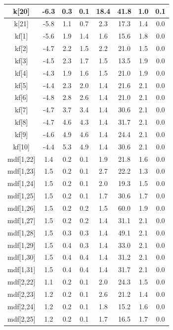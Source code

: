 \begin{longtable}{|c|c|c|c|c|c|c|c|}
\hline
k[20] & -6.3 & 0.3 & 0.1 & 18.4 & 41.8 & 1.0 & 0.1 \\
\hline
k[21] & -5.8 & 1.1 & 0.7 & 2.3 & 17.3 & 1.4 & 0.0 \\
\hline
kf[1] & -5.6 & 1.9 & 1.4 & 1.6 & 15.6 & 1.8 & 0.0 \\
\hline
kf[2] & -4.7 & 2.2 & 1.5 & 2.2 & 21.0 & 1.5 & 0.0 \\
\hline
kf[3] & -4.5 & 2.3 & 1.7 & 1.5 & 13.5 & 1.9 & 0.0 \\
\hline
kf[4] & -4.3 & 1.9 & 1.6 & 1.5 & 21.0 & 1.9 & 0.0 \\
\hline
kf[5] & -4.4 & 2.3 & 2.0 & 1.4 & 21.6 & 2.1 & 0.0 \\
\hline
kf[6] & -4.8 & 2.8 & 2.6 & 1.4 & 21.0 & 2.1 & 0.0 \\
\hline
kf[7] & -4.7 & 3.7 & 3.4 & 1.4 & 30.6 & 2.1 & 0.0 \\
\hline
kf[8] & -4.7 & 4.6 & 4.3 & 1.4 & 31.7 & 2.1 & 0.0 \\
\hline
kf[9] & -4.6 & 4.9 & 4.6 & 1.4 & 24.4 & 2.1 & 0.0 \\
\hline
kf[10] & -4.4 & 5.3 & 4.9 & 1.4 & 30.6 & 2.1 & 0.0 \\
\hline
mdf[1,22] & 1.4 & 0.2 & 0.1 & 1.9 & 21.8 & 1.6 & 0.0 \\
\hline
mdf[1,23] & 1.5 & 0.2 & 0.1 & 2.7 & 22.2 & 1.3 & 0.0 \\
\hline
mdf[1,24] & 1.5 & 0.2 & 0.1 & 2.0 & 19.3 & 1.5 & 0.0 \\
\hline
mdf[1,25] & 1.5 & 0.2 & 0.1 & 1.7 & 30.6 & 1.7 & 0.0 \\
\hline
mdf[1,26] & 1.5 & 0.2 & 0.2 & 1.5 & 60.0 & 1.9 & 0.0 \\
\hline
mdf[1,27] & 1.5 & 0.2 & 0.2 & 1.4 & 31.1 & 2.1 & 0.0 \\
\hline
mdf[1,28] & 1.5 & 0.3 & 0.3 & 1.4 & 49.1 & 2.1 & 0.0 \\
\hline
mdf[1,29] & 1.5 & 0.4 & 0.3 & 1.4 & 33.0 & 2.1 & 0.0 \\
\hline
mdf[1,30] & 1.5 & 0.4 & 0.4 & 1.4 & 31.2 & 2.1 & 0.0 \\
\hline
mdf[1,31] & 1.5 & 0.4 & 0.4 & 1.4 & 31.7 & 2.1 & 0.0 \\
\hline
mdf[2,22] & 1.1 & 0.2 & 0.1 & 2.0 & 24.3 & 1.5 & 0.0 \\
\hline
mdf[2,23] & 1.2 & 0.2 & 0.1 & 2.6 & 21.2 & 1.4 & 0.0 \\
\hline
mdf[2,24] & 1.2 & 0.2 & 0.1 & 1.8 & 15.2 & 1.6 & 0.0 \\
\hline
mdf[2,25] & 1.2 & 0.2 & 0.1 & 1.7 & 16.5 & 1.7 & 0.0 \\

\end{longtable}

